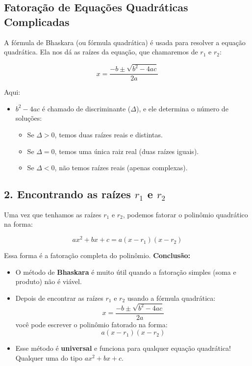 \documentclass{article}
\begin{document}
\subsection{Fatoração de Equações Quadráticas Complicadas}
A fórmula de Bhaskara (ou fórmula quadrática) é usada para resolver a equação quadrática. Ela nos dá as raízes da equação, que chamaremos de \(r_1\) e \(r_2\):

\[
x = \frac{-b \pm \sqrt{b^2 - 4ac}}{2a}
\]

Aqui:
\begin{itemize}
    \item \(b^2 - 4ac\) é chamado de discriminante (\(\Delta\)), e ele determina o número de soluções:
    \begin{itemize}
        \item Se \(\Delta > 0\), temos duas raízes reais e distintas.
        \item Se \(\Delta = 0\), temos uma única raiz real (duas raízes iguais).
        \item Se \(\Delta < 0\), não temos raízes reais (apenas complexas).
    \end{itemize}
\end{itemize}

\subsection*{2. Encontrando as raízes \(r_1\) e \(r_2\)}

Uma vez que tenhamos as raízes \(r_1\) e \(r_2\), podemos fatorar o polinômio quadrático na forma:

\[
ax^2 + bx + c = a(x - r_1)(x - r_2)
\]

Essa forma é a fatoração completa do polinômio.
\textbf{Conclusão:}

\begin{itemize}
    \item O método de \textbf{Bhaskara} é muito útil quando a fatoração simples (soma e produto) não é viável.

    \item Depois de encontrar as raízes \(r_1\) e \(r_2\) usando a fórmula quadrática:
    \[
    x = \frac{{-b \pm \sqrt{{b^2 - 4ac}}}}{2a}
    \]
    você pode escrever o polinômio fatorado na forma:
    \[
    a(x - r_1)(x - r_2)
    \]

    \item Esse método é \textbf{universal} e funciona para qualquer equação quadrática! Qualquer uma do tipo \(ax^2 + bx + c\).
    
\end{itemize}
\end{document}
